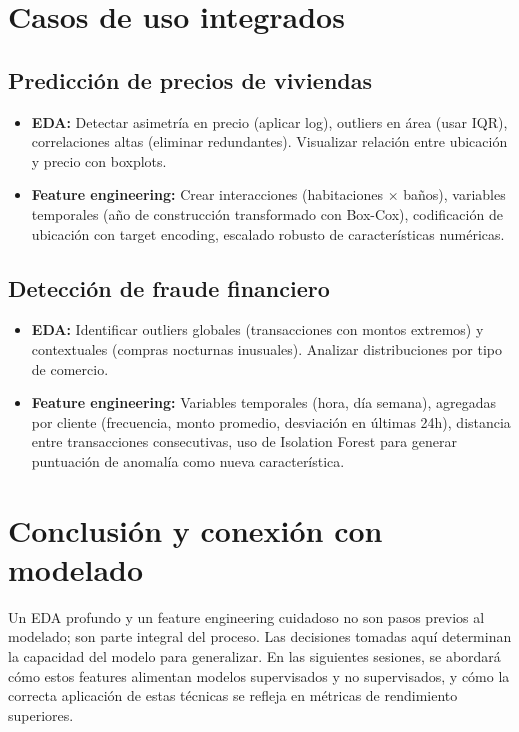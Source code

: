 \documentclass[12pt,a4paper,openany,oneside]{book}
\begin{document}
\section{Casos de uso integrados}

\subsection{Predicción de precios de viviendas}
\begin{itemize}
    \item \textbf{EDA:} Detectar asimetría en precio (aplicar log), outliers en área (usar IQR), correlaciones altas (eliminar redundantes). Visualizar relación entre ubicación y precio con boxplots.
    \item \textbf{Feature engineering:} Crear interacciones (habitaciones $\times$ baños), variables temporales (año de construcción transformado con Box-Cox), codificación de ubicación con target encoding, escalado robusto de características numéricas.
\end{itemize}

\subsection{Detección de fraude financiero}
\begin{itemize}
    \item \textbf{EDA:} Identificar outliers globales (transacciones con montos extremos) y contextuales (compras nocturnas inusuales). Analizar distribuciones por tipo de comercio.
    \item \textbf{Feature engineering:} Variables temporales (hora, día semana), agregadas por cliente (frecuencia, monto promedio, desviación en últimas 24h), distancia entre transacciones consecutivas, uso de Isolation Forest para generar puntuación de anomalía como nueva característica.
\end{itemize}

\section{Conclusión y conexión con modelado}
Un EDA profundo y un feature engineering cuidadoso no son pasos previos al modelado; son parte integral del proceso. Las decisiones tomadas aquí determinan la capacidad del modelo para generalizar. En las siguientes sesiones, se abordará cómo estos features alimentan modelos supervisados y no supervisados, y cómo la correcta aplicación de estas técnicas se refleja en métricas de rendimiento superiores.
\end{document}
